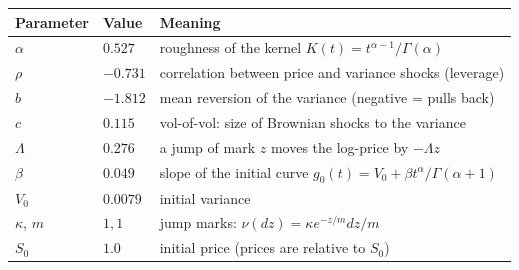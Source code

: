 \begin{tabular}{llp{8.2cm}}
\toprule
Parameter & Value & Meaning \\
\midrule
$\alpha$ & $0.527$ & roughness of the kernel $K(t)=t^{\alpha-1}/\Gamma(\alpha)$ \\
$\rho$ & $-0.731$ & correlation between price and variance shocks (leverage) \\
$b$ & $-1.812$ & mean reversion of the variance (negative = pulls back) \\
$c$ & $0.115$ & vol-of-vol: size of Brownian shocks to the variance \\
$\Lambda$ & $0.276$ & a jump of mark $z$ moves the log-price by $-\Lambda z$ \\
$\beta$ & $0.049$ & slope of the initial curve $g_0(t)=V_0+\beta t^\alpha/\Gamma(\alpha+1)$ \\
$V_0$ & $0.0079$ & initial variance \\
$\kappa$, $m$ & $1, 1$ & jump marks: $\nu(dz)=\kappa e^{-z/m}dz/m$ \\
$S_0$ & $1.0$ & initial price (prices are relative to $S_0$) \\
\bottomrule
\end{tabular}
